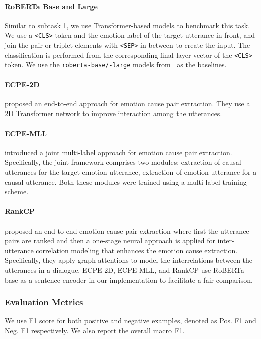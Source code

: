 \documentclass[smallextended]{svjour3}
\newcommand\code[1]{\texttt{#1}}
\newcommand\0{\hphantom{0}}
\begin{document}
\paragraph{RoBERTa Base and Large}
Similar to subtask 1, we use Transformer-based models to benchmark this task. We use a \code{<CLS>} token and the emotion label  of the target utterance  in front, and join the pair or triplet elements with \code{<SEP>} in between to create the input. 
The classification is performed from the corresponding final layer vector of the \code{<CLS>} token. 
We use the \code{roberta-base/-large} models from~\citep{liu2019roberta} as the baselines.


\paragraph{ECPE-2D}
\citet{DBLP:conf/acl/DingXY20} proposed an end-to-end approach for emotion cause pair extraction. They use a 2D Transformer network to improve interaction among the utterances.

\paragraph{ECPE-MLL}
\citet{DBLP:conf/emnlp/DingXY20} introduced a joint multi-label approach for emotion cause pair extraction. Specifically, the joint framework comprises two modules:  extraction of causal utterances for the target emotion utterance,  extraction of emotion utterance for a causal utterance. Both these modules were trained using a multi-label training scheme. 

\paragraph{RankCP}
\citet{wei-etal-2020-effective} proposed an end-to-end emotion cause pair extraction where first the utterance pairs are ranked and then a one-stage neural approach is applied for inter-utterance correlation modeling that enhances the emotion cause extraction. Specifically, they apply graph attentions to model the interrelations between the
utterances in a dialogue.
ECPE-2D, ECPE-MLL, and RankCP use RoBERTa-base as a sentence encoder in our implementation to facilitate a fair comparison.

\subsubsection{Evaluation Metrics}
We use F1 score for both positive and negative examples, denoted as Pos. F1 and Neg. F1 respectively. We also report the overall macro F1.
\end{document}
